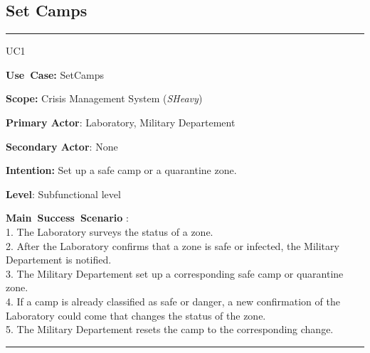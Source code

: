 \subsection{Set Camps}
\vspace{0.5cm}
\hrule
\vspace{0.5cm}
\begin{lyxlist}{UC1}
\small{
\item [\textbf{Use~Case:}] SetCamps
\item [\textbf{Scope:}] Crisis Management System (\emph{SHeavy})
\item [\textbf{Primary Actor}:] Laboratory, Military Departement
\item [\textbf{Secondary Actor}:] None
\item [\textbf{Intention:}] Set up a safe camp or a quarantine zone.
\item [\textbf{Level}:]Subfunctional level
\item [\textbf{Main~Success~Scenario}]:\\
1. The Laboratory surveys the status of a zone.\\
2. After the Laboratory confirms that a zone is safe or infected, the
Military Departement is notified.\\
3. The Military Departement set up a corresponding safe camp or quarantine
zone.\\ 
4.	If a camp is already classified as safe or danger, a new confirmation of the
Laboratory could come that changes the status of the zone.\\
5. The Military Departement resets the camp to the corresponding change.\\
}
\end{lyxlist}
\hrule
\vspace{0.5cm} 

